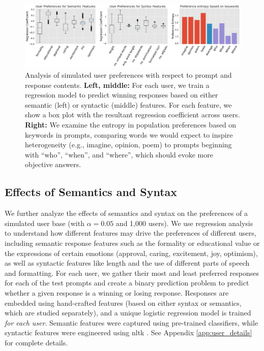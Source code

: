 \begin{figure}[t]
    \centering 
    \includegraphics[width=\linewidth]{figures/syn_sem_ent.png}
    \caption{Analysis of simulated user preferences with respect to prompt and response contents.
    \textbf{Left, middle:} For each user, we train a regression model to predict winning responses based on either semantic (left) or syntactic (middle) features.  For each feature, we show a box plot with the resultant regression coefficient across users.
    \textbf{Right:} We examine the entropy in population preferences based on keywords in prompts, comparing words we would expect to inspire heterogeneity (e.g., imagine, opinion, poem) to prompts beginning with ``who'', ``when'', and ``where'', which should evoke more objective answers. 
    }
    \label{fig:sem_syn}
\end{figure}

\subsection{Effects of Semantics and Syntax}



We further analyze the effects of semantics and syntax on the preferences of a simulated user base (with $\alpha=0.05$ and 1,000 users).  We use regression analysis to understand how different features may drive the preferences of different users, including semantic response features such as the formality or educational value or the expressions of certain emotions (approval, caring, excitement, joy, optimism), as well as syntactic features like length and the use of different parts of speech and formatting.
For each user, we gather their most and least preferred responses for each of the test prompts and create a binary prediction problem to predict whether a given response is a winning or losing response.
Responses are embedded using hand-crafted features (based on either syntax or semantics, which are studied separately), and a unique logistic regression model is trained \textit{for each user}.
Semantic features were captured using pre-trained classifiers, while syntactic features were engineered using nltk \citep{bird-loper-2004-nltk}.  See Appendix \ref{app:user_details} for complete details.

